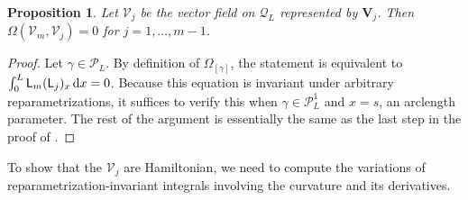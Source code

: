 \documentclass[10pt,a4paper]{amsart}
\newcommand\Leg{ {\mathcal P}} %
\newcommand\Legq{\mathcal Q}
\newcommand\uL{\mathsf L} %
\def\vecV{\mathbf V}
\newcommand\qV{\mathcal V}%
\def\gam{\gamma} %
\numberwithin{equation}{section}
\newtheorem{Proposition}[Theorem]{Proposition}
 { \theoremstyle{definition}
\newtheorem{Definition}[Theorem]{Definition}
\newtheorem{Note}[Theorem]{Note}
\newtheorem{Example}[Theorem]{Example}
\newtheorem{Remark}[Theorem]{Remark} }
\begin{document}
\begin{Proposition} Let $\qV_j$ be the vector field on $\Legq_L$ represented by $\vecV_j$. Then $\Omega(\qV_m ,\qV_j) =0$ for $j=1,\ldots, m-1$.
\end{Proposition}
\begin{proof} Let $\gam\in \Leg_L$. By definition of $\Omega_{[\gamma]}$, the statement is equivalent to $\int_0^L \uL_m (\uL_j)_x \,{\rm d}x=0$.
Because this equation is invariant under arbitrary reparametrizations, it
suffices to verify this when $\gam\in \Leg^1_L$ and $x=s$, an arclength parameter. The rest of the argument is essentially
the same as the last step in the proof of \cite[Lemma~7.25]{OlverLieGroups}.
\end{proof}

To show that the $\qV_j$ are Hamiltonian, we need to compute the variations of reparametrization-invariant integrals involving the curvature and its derivatives.
\end{document}
